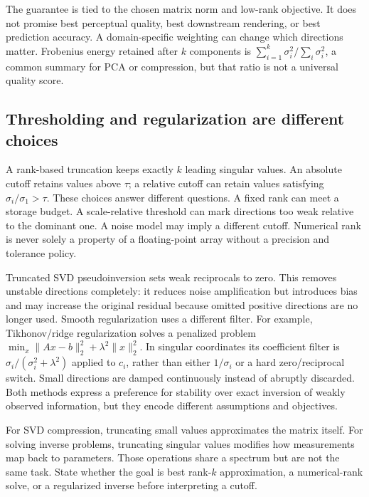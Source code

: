 The guarantee is tied to the chosen matrix norm and low-rank objective. It does not promise best perceptual quality, best downstream rendering, or best prediction accuracy. A domain-specific weighting can change which directions matter. Frobenius energy retained after \(k\) components is \(\sum_{i=1}^k\sigma_i^2/\sum_i\sigma_i^2\), a common summary for PCA or compression, but that ratio is not a universal quality score.

\subsection{Thresholding and regularization are different choices}\label{02-foundations-ii-ch024-thresholding-and-regularization-are-different-choices}

\hypertarget{02-foundations-ii-ch024-thresholding-and-regularization-are-different-choices}{}

A rank-based truncation keeps exactly \(k\) leading singular values. An absolute cutoff retains values above \(\tau\); a relative cutoff can retain values satisfying \(\sigma_i/\sigma_1>\tau\). These choices answer different questions. A fixed rank can meet a storage budget. A scale-relative threshold can mark directions too weak relative to the dominant one. A noise model may imply a different cutoff. Numerical rank is never solely a property of a floating-point array without a precision and tolerance policy.

Truncated SVD pseudoinversion sets weak reciprocals to zero. This removes unstable directions completely: it reduces noise amplification but introduces bias and may increase the original residual because omitted positive directions are no longer used. Smooth regularization uses a different filter. For example, Tikhonov/ridge regularization solves a penalized problem \(\min_x \|Ax-b\|_2^2+\lambda^2\|x\|_2^2\). In singular coordinates its coefficient filter is \(\sigma_i/(\sigma_i^2+\lambda^2)\) applied to \(c_i\), rather than either \(1/\sigma_i\) or a hard zero/reciprocal switch. Small directions are damped continuously instead of abruptly discarded. Both methods express a preference for stability over exact inversion of weakly observed information, but they encode different assumptions and objectives.

For SVD compression, truncating small values approximates the matrix itself. For solving inverse problems, truncating singular values modifies how measurements map back to parameters. Those operations share a spectrum but are not the same task. State whether the goal is best rank-\(k\) approximation, a numerical-rank solve, or a regularized inverse before interpreting a cutoff.

